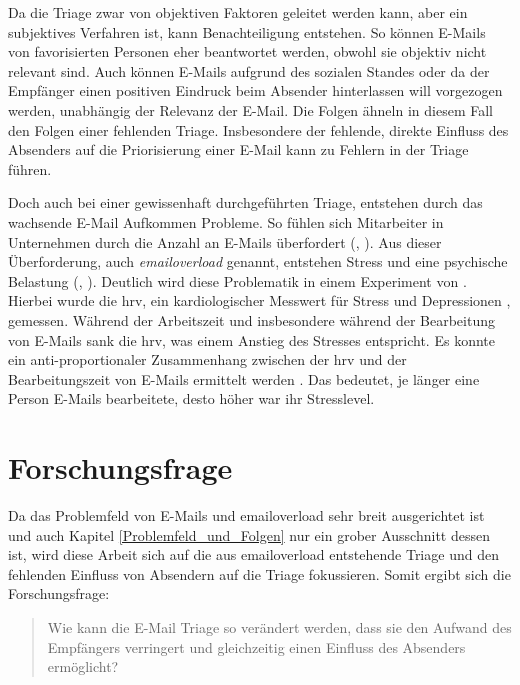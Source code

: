 Da die Triage zwar von objektiven Faktoren geleitet werden kann, aber ein subjektives Verfahren ist, kann Benachteiligung entstehen. So können E-Mails von favorisierten Personen eher beantwortet werden, obwohl sie objektiv nicht relevant sind. Auch können E-Mails aufgrund des sozialen Standes oder da der Empfänger einen positiven Eindruck beim Absender hinterlassen will vorgezogen werden, unabhängig der Relevanz der E-Mail. Die Folgen ähneln in diesem Fall den Folgen einer fehlenden Triage. Insbesondere der fehlende, direkte Einfluss des Absenders auf die Priorisierung einer E-Mail kann zu Fehlern in der Triage führen.

Doch auch bei einer gewissenhaft durchgeführten Triage, entstehen durch das wachsende E-Mail Aufkommen Probleme. So fühlen sich Mitarbeiter in Unternehmen durch die Anzahl an E-Mails überfordert (\cite[S. 179]{Dawley2003}, \cite[S. 264 f.]{Thomas2006}). Aus dieser Überforderung, auch \textit{\gls{emailoverload}} genannt, entstehen Stress und eine psychische Belastung (\cite[S. 117]{Lagrana2016}, \cite[S. 331]{Eppler2004}). Deutlich wird diese Problematik in einem Experiment von \cite{Mark2016}. Hierbei wurde die \acrfull{hrv}, ein kardiologischer Messwert für Stress und Depressionen \citep[S. 881]{Vrijkotte2000}, gemessen. Während der Arbeitszeit und insbesondere während der Bearbeitung von E-Mails sank die \acrshort{hrv}, was einem Anstieg des Stresses entspricht. Es konnte ein anti-proportionaler Zusammenhang zwischen der \acrshort{hrv} und der Bearbeitungszeit von E-Mails ermittelt werden \citep[S. 1724]{Mark2016}. Das bedeutet, je länger eine Person E-Mails bearbeitete, desto höher war ihr Stresslevel. 



\section{Forschungsfrage}
\label{Forschungsfrage}

Da das Problemfeld von E-Mails und \gls{emailoverload} sehr breit ausgerichtet ist und auch Kapitel \ref{Problemfeld_und_Folgen} nur ein grober Ausschnitt dessen ist, wird diese Arbeit sich auf die aus \gls{emailoverload} entstehende Triage und den fehlenden Einfluss von Absendern auf die Triage fokussieren. Somit ergibt sich die Forschungsfrage: 

\begin{quotation}
	\noindent Wie kann die E-Mail Triage so verändert werden, dass sie den Aufwand des Empfängers verringert und gleichzeitig einen Einfluss des Absenders ermöglicht?
\end{quotation}

